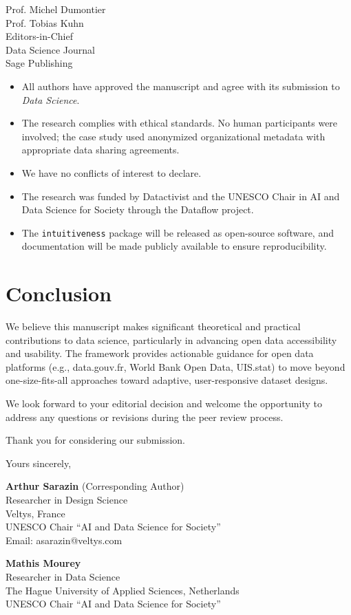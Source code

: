 \documentclass[11pt,a4paper]{letter}
\begin{document}
\begin{letter}{%
Prof. Michel Dumontier\\
Prof. Tobias Kuhn\\
Editors-in-Chief\\
Data Science Journal\\
Sage Publishing
}
\begin{itemize}
    \item All authors have approved the manuscript and agree with its submission to \textit{Data Science}.

    \item The research complies with ethical standards. No human participants were involved; the case study used anonymized organizational metadata with appropriate data sharing agreements.

    \item We have no conflicts of interest to declare.

    \item The research was funded by Datactivist and the UNESCO Chair in AI and Data Science for Society through the Dataflow project.

    \item The \texttt{intuitiveness} package will be released as open-source software, and documentation will be made publicly available to ensure reproducibility.
\end{itemize}

\section*{Conclusion}

We believe this manuscript makes significant theoretical and practical contributions to data science, particularly in advancing open data accessibility and usability. The framework provides actionable guidance for open data platforms (e.g., data.gouv.fr, World Bank Open Data, UIS.stat) to move beyond one-size-fits-all approaches toward adaptive, user-responsive dataset designs.

We look forward to your editorial decision and welcome the opportunity to address any questions or revisions during the peer review process.

Thank you for considering our submission.

\closing{Yours sincerely,}

\vspace{1.5cm}

\textbf{Arthur Sarazin} (Corresponding Author)\\
Researcher in Design Science\\
Veltys, France\\
UNESCO Chair ``AI and Data Science for Society''\\
Email: asarazin@veltys.com

\vspace{1cm}

\textbf{Mathis Mourey}\\
Researcher in Data Science\\
The Hague University of Applied Sciences, Netherlands\\
UNESCO Chair ``AI and Data Science for Society''

\end{letter}
\end{document}
